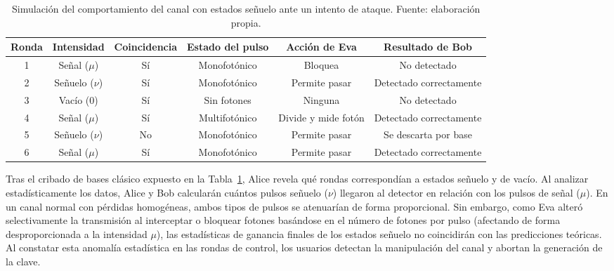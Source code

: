 \begin{table}[h]
    \centering
    \small
    \begin{tabular}{c c c c c c}
        \hline\hline
        Ronda & Intensidad & Coincidencia & Estado del pulso & Acción de Eva & Resultado de Bob \\
        \hline
        1 & Señal ($\mu$) & Sí & Monofotónico & Bloquea & No detectado \\
        2 & Señuelo ($\nu$) & Sí & Monofotónico & Permite pasar & Detectado correctamente \\
        3 & Vacío ($0$) & Sí & Sin fotones & Ninguna & No detectado \\
        4 & Señal ($\mu$) & Sí & Multifotónico & Divide y mide fotón & Detectado correctamente \\
        5 & Señuelo ($\nu$) & No & Monofotónico & Permite pasar & Se descarta por base \\
        6 & Señal ($\mu$) & Sí & Monofotónico & Permite pasar & Detectado correctamente \\
        \hline
    \end{tabular}
    \caption[Ejemplo operativo con estados señuelo]{Simulación del comportamiento del canal con estados señuelo ante un intento de ataque. Fuente: elaboración propia.}
    \label{tab:decoy_ejemplo}
\end{table}

Tras el cribado de bases clásico expuesto en la Tabla~\ref{tab:decoy_ejemplo}, Alice revela qué rondas correspondían a estados señuelo y de vacío. Al analizar estadísticamente los datos, Alice y Bob calcularán cuántos pulsos señuelo ($\nu$) llegaron al detector en relación con los pulsos de señal ($\mu$). En un canal normal con pérdidas homogéneas, ambos tipos de pulsos se atenuarían de forma proporcional. Sin embargo, como Eva alteró selectivamente la transmisión al interceptar o bloquear fotones basándose en el número de fotones por pulso (afectando de forma desproporcionada a la intensidad $\mu$), las estadísticas de ganancia finales de los estados señuelo no coincidirán con las predicciones teóricas. Al constatar esta anomalía estadística en las rondas de control, los usuarios detectan la manipulación del canal y abortan la generación de la clave.
